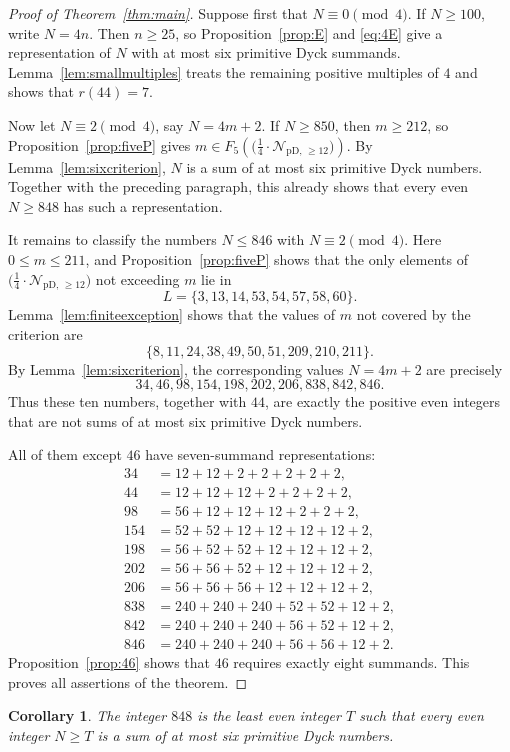 \documentclass[12pt]{article}
\theoremstyle{plain}
\newtheorem{corollary}[theorem]{Corollary}
\newcommand{\Pset}{\bigl(\tfrac14\cdot
  \mathcal{N}_{\mathrm{pD},\,\geq12}\bigr)}
\begin{document}
\begin{proof}[Proof of Theorem~\ref{thm:main}]
Suppose first that $N\equiv0\pmod 4$.  If $N\geq100$, write $N=4n$.
Then $n\geq25$, so Proposition~\ref{prop:E} and \eqref{eq:4E} give a
representation of $N$ with at most six primitive Dyck summands.
Lemma~\ref{lem:smallmultiples} treats the remaining positive multiples
of $4$ and shows that $r(44)=7$.

Now let $N\equiv2\pmod 4$, say $N=4m+2$.  If $N\geq850$, then $m\geq212$,
so Proposition~\ref{prop:fiveP} gives $m\in F_5(\Pset)$.  By
Lemma~\ref{lem:sixcriterion}, $N$ is a sum of at most six primitive
Dyck numbers.  Together with the preceding paragraph, this already
shows that every even $N\geq848$ has such a representation.

It remains to classify the numbers $N\leq846$ with $N\equiv2\pmod 4$.
Here $0\leq m\leq211$, and Proposition~\ref{prop:fiveP} shows that the
only elements of $\Pset$ not exceeding $m$ lie in
\[
 L=\{3,13,14,53,54,57,58,60\}.
\]
Lemma~\ref{lem:finiteexception} shows that the values of $m$ not
covered by the criterion are
\[
 \{8,11,24,38,49,50,51,209,210,211\}.
\]
By Lemma~\ref{lem:sixcriterion}, the corresponding values $N=4m+2$
are precisely
\[
 34,46,98,154,198,202,206,838,842,846.
\]
Thus these ten numbers, together with $44$, are exactly the positive
even integers that are not sums of at most six primitive Dyck numbers.

All of them except $46$ have seven-summand representations:
\[
\begin{aligned}
34&=12+12+2+2+2+2+2,\\
44&=12+12+12+2+2+2+2,\\
98&=56+12+12+12+2+2+2,\\
154&=52+52+12+12+12+12+2,\\
198&=56+52+52+12+12+12+2,\\
202&=56+56+52+12+12+12+2,\\
206&=56+56+56+12+12+12+2,\\
838&=240+240+240+52+52+12+2,\\
842&=240+240+240+56+52+12+2,\\
846&=240+240+240+56+56+12+2.
\end{aligned}
\]
Proposition~\ref{prop:46} shows that $46$ requires exactly eight
summands.  This proves all assertions of the theorem.
\end{proof}

\begin{corollary}\label{cor:threshold}
The integer $848$ is the least even integer $T$ such that every even
integer $N\geq T$ is a sum of at most six primitive Dyck numbers.
\end{corollary}
\end{document}
